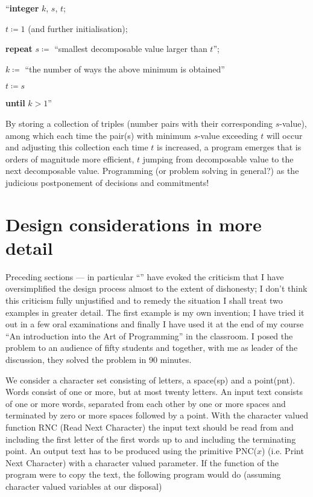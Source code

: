 ``\textbf{integer} $k$, $s$, $t$;

$t \coloneq 1$ (and further initialisation);

\textbf{repeat} $s \coloneq$ ``smallest decomposable value larger than $t$'';

\quad $k \coloneq$ ``the number of ways the above minimum is obtained''

\quad $t \coloneq s$

\textbf{until} $k > 1$''

By storing a collection of triples (number pairs with their corresponding $s$-value), among which each time the pair(s) with minimum $s$-value exceeding $t$ will occur and adjusting this collection each time $t$ is increased, a program emerges that is orders of magnitude more efficient, $t$ jumping from decomposable value to the next decomposable value. Programming (or problem solving in general?) as the judicious postponement of decisions and commitments!

\section{Design considerations in more detail}

Preceding sections --- in particular ``'' have evoked the criticism that I have oversimplified the design process almost to the extent of dishonesty; I don't think this criticism fully unjustified and to remedy the situation I shall treat two examples in greater detail. The first example is my own invention; I have tried it out in a few oral examinations and finally I have used it at the end of my course ``An introduction into the Art of Programming'' in the classroom. I posed the problem to an audience of fifty students and together, with me as leader of the discussion, they solved the problem in 90 minutes.

We consider a character set consisting of letters, a space(sp) and a point(pnt). Words consist of one or more, but at most twenty letters. An input text consists of one or more words, separated from each other by one or more spaces and terminated by zero or more spaces followed by a point. With the character valued function RNC (Read Next Character) the input text should be read from and including the first letter of the first words up to and including the terminating point. An output text has to be produced using the primitive PNC($x$) (i.e. Print Next Character) with a character valued parameter. If the function of the program were to copy the text, the following program would do (assuming character valued variables at our disposal)

